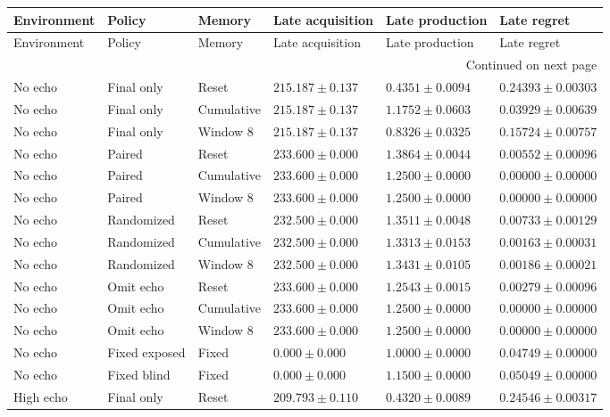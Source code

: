 \begin{longtable}{@{}llllll@{}}
\toprule Environment & Policy & Memory & Late acquisition & Late production & Late regret \\\midrule\endfirsthead
\toprule Environment & Policy & Memory & Late acquisition & Late production & Late regret \\\midrule\endhead
\midrule\multicolumn{6}{r}{Continued on next page}\\\endfoot
\bottomrule\endlastfoot
No echo & Final only & Reset & $215.187 \pm 0.137$ & $0.4351 \pm 0.0094$ & $0.24393 \pm 0.00303$ \\
No echo & Final only & Cumulative & $215.187 \pm 0.137$ & $1.1752 \pm 0.0603$ & $0.03929 \pm 0.00639$ \\
No echo & Final only & Window 8 & $215.187 \pm 0.137$ & $0.8326 \pm 0.0325$ & $0.15724 \pm 0.00757$ \\
No echo & Paired & Reset & $233.600 \pm 0.000$ & $1.3864 \pm 0.0044$ & $0.00552 \pm 0.00096$ \\
No echo & Paired & Cumulative & $233.600 \pm 0.000$ & $1.2500 \pm 0.0000$ & $0.00000 \pm 0.00000$ \\
No echo & Paired & Window 8 & $233.600 \pm 0.000$ & $1.2500 \pm 0.0000$ & $0.00000 \pm 0.00000$ \\
No echo & Randomized & Reset & $232.500 \pm 0.000$ & $1.3511 \pm 0.0048$ & $0.00733 \pm 0.00129$ \\
No echo & Randomized & Cumulative & $232.500 \pm 0.000$ & $1.3313 \pm 0.0153$ & $0.00163 \pm 0.00031$ \\
No echo & Randomized & Window 8 & $232.500 \pm 0.000$ & $1.3431 \pm 0.0105$ & $0.00186 \pm 0.00021$ \\
No echo & Omit echo & Reset & $233.600 \pm 0.000$ & $1.2543 \pm 0.0015$ & $0.00279 \pm 0.00096$ \\
No echo & Omit echo & Cumulative & $233.600 \pm 0.000$ & $1.2500 \pm 0.0000$ & $0.00000 \pm 0.00000$ \\
No echo & Omit echo & Window 8 & $233.600 \pm 0.000$ & $1.2500 \pm 0.0000$ & $0.00000 \pm 0.00000$ \\
No echo & Fixed exposed & Fixed & $0.000 \pm 0.000$ & $1.0000 \pm 0.0000$ & $0.04749 \pm 0.00000$ \\
No echo & Fixed blind & Fixed & $0.000 \pm 0.000$ & $1.1500 \pm 0.0000$ & $0.05049 \pm 0.00000$ \\
High echo & Final only & Reset & $209.793 \pm 0.110$ & $0.4320 \pm 0.0089$ & $0.24546 \pm 0.00317$ \\

\end{longtable}
